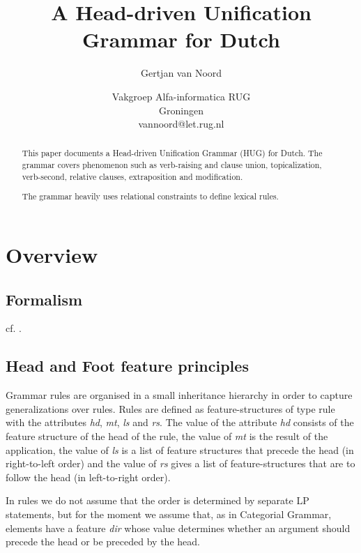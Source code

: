 \long{}

\setlength{\mathindent}{0ex}


\title{A Head-driven Unification Grammar for Dutch}
\author{Gertjan van Noord}
\date{Vakgroep Alfa-informatica RUG\\
Groningen \\ vannoord@let.rug.nl}
\maketitle


\begin{abstract}
This paper documents a Head-driven Unification Grammar (HUG) for Dutch. The grammar covers phenomenon
such as verb-raising and clause union, topicalization, verb-second,
relative clauses, extraposition and modification.

The grammar heavily uses relational constraints to define lexical
rules.  
\end{abstract}

\section{Overview}

\subsection{Formalism}

cf. .

\subsection{Head and Foot feature principles}

Grammar rules are organised in a small inheritance hierarchy in order
to capture generalizations over rules. Rules are defined as
feature-structures of type {\sc rule} with the attributes {\it hd},
{\it mt}, {\it ls} and {\it rs}.
The value of the attribute {\it hd} consists of the
feature structure of the head of the rule, the value of 
{\it mt} is the result of the application, the value of {\it ls}
is a list of feature structures that precede the head (in
right-to-left order) and the value of {\it rs} gives a list of
feature-structures that are to follow the head (in left-to-right
order). 

In  rules we do not assume that the order is
determined by separate LP statements, but for the moment we assume
that, as in Categorial Grammar, elements have a feature {\it dir}
whose value determines whether an argument should precede the head or
be preceded by the head. 


